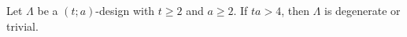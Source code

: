 Let $\Lambda$ be a $(t; a)$-design with $t \geq 2$ and $a \geq 2$. If $ta > 4$, then $\Lambda$ is degenerate or trivial.
